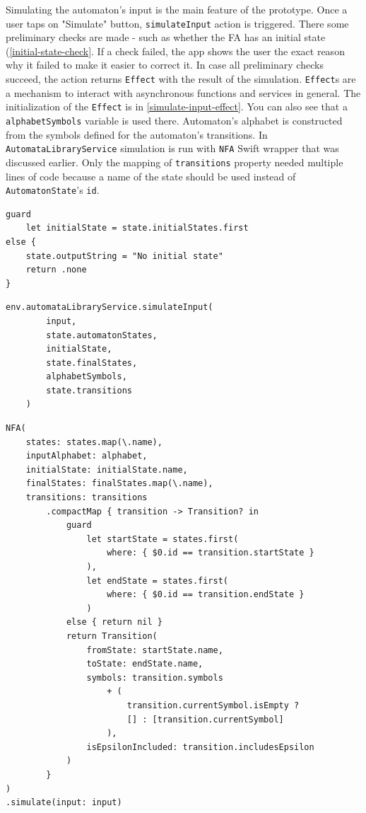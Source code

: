 Simulating the automaton's input is the main feature of the prototype. Once a user taps on "Simulate" button, \lstinline{simulateInput} action is triggered. There some preliminary checks are made - such as whether the FA has an initial state (\ref{initial-state-check}. If a check failed, the app shows the user the exact reason why it failed to make it easier to correct it. In case all preliminary checks succeed, the action returns \lstinline{Effect} with the result of the simulation. \lstinline{Effect}s are a mechanism to interact with asynchronous functions and services in general. The initialization of the \lstinline{Effect} is in \ref{simulate-input-effect}. You can also see that a \lstinline{alphabetSymbols} variable is used there. Automaton's alphabet is constructed from the symbols defined for the automaton's transitions. In \lstinline{AutomataLibraryService} simulation is run with \lstinline{NFA} Swift wrapper that was discussed earlier. Only the mapping of \lstinline{transitions} property needed multiple lines of code because a name of the state should be used instead of \lstinline{AutomatonState}'s \lstinline{id}.

\begin{lstlisting}[caption={Check for initial state}, label=initial-state-check]
guard
    let initialState = state.initialStates.first
else {
    state.outputString = "No initial state"
    return .none
}
\end{lstlisting}   

\begin{lstlisting}[caption={Effect for simulating input}, label=simulate-input-effect]
env.automataLibraryService.simulateInput(
        input,
        state.automatonStates,
        initialState,
        state.finalStates,
        alphabetSymbols,
        state.transitions
    )
\end{lstlisting}

\begin{lstlisting}[caption={\lstinline{NFA} initialization in \lstinline{AutomataLibrarryService}}, label=nfa-init]
NFA(
    states: states.map(\.name),
    inputAlphabet: alphabet,
    initialState: initialState.name,
    finalStates: finalStates.map(\.name),
    transitions: transitions
        .compactMap { transition -> Transition? in
            guard
                let startState = states.first(
                    where: { $0.id == transition.startState }
                ),
                let endState = states.first(
                    where: { $0.id == transition.endState }
                )
            else { return nil }
            return Transition(
                fromState: startState.name,
                toState: endState.name,
                symbols: transition.symbols
                    + (
                        transition.currentSymbol.isEmpty ? 
                        [] : [transition.currentSymbol]
                    ),
                isEpsilonIncluded: transition.includesEpsilon
            )
        }
)
.simulate(input: input)
\end{lstlisting}

